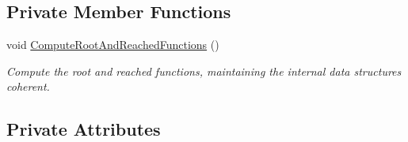 \subsection*{Private Member Functions}
\begin{DoxyCompactItemize}
\item 
void \hyperlink{classCallGraphManager_abcbe2ee2364242c09a811a07139f10fb}{Compute\+Root\+And\+Reached\+Functions} ()
\begin{DoxyCompactList}\small\item\em Compute the root and reached functions, maintaining the internal data structures coherent. \end{DoxyCompactList}\end{DoxyCompactItemize}
\subsection*{Private Attributes}
